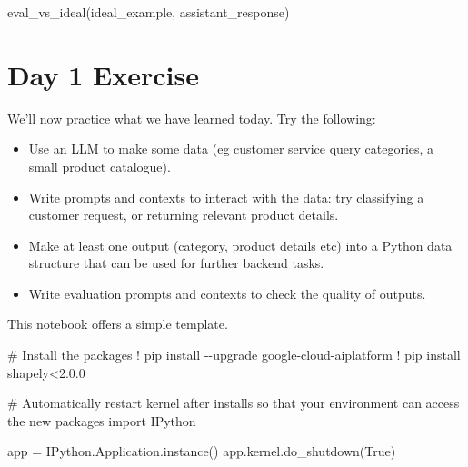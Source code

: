 \documentclass[
  letterpaper,
  DIV=11,
  numbers=noendperiod]{scrreprt}
\newenvironment{Shaded}{\begin{snugshade}}{\end{snugshade}}
\newcommand{\CommentTok}[1]{\textcolor[rgb]{0.37,0.37,0.37}{#1}}
\newcommand{\FloatTok}[1]{\textcolor[rgb]{0.68,0.00,0.00}{#1}}
\newcommand{\ImportTok}[1]{\textcolor[rgb]{0.00,0.46,0.62}{#1}}
\newcommand{\NormalTok}[1]{\textcolor[rgb]{0.00,0.23,0.31}{#1}}
\newcommand{\OperatorTok}[1]{\textcolor[rgb]{0.37,0.37,0.37}{#1}}
\newcommand{\VariableTok}[1]{\textcolor[rgb]{0.07,0.07,0.07}{#1}}
\begin{document}
\begin{Shaded}
\begin{Highlighting}[]
\NormalTok{eval\_vs\_ideal(ideal\_example, assistant\_response)}
\end{Highlighting}
\end{Shaded}

\hypertarget{day-1-exercise}{%
\chapter{Day 1 Exercise}\label{day-1-exercise}}

We'll now practice what we have learned today. Try the following:

\begin{itemize}
\item
  Use an LLM to make some data (eg customer service query categories, a
  small product catalogue).
\item
  Write prompts and contexts to interact with the data: try classifying
  a customer request, or returning relevant product details.
\item
  Make at least one output (category, product details etc) into a Python
  data structure that can be used for further backend tasks.
\item
  Write evaluation prompts and contexts to check the quality of outputs.
\end{itemize}

This notebook offers a simple template.

\begin{Shaded}
\begin{Highlighting}[]
\CommentTok{\# Install the packages}
\OperatorTok{!}\NormalTok{ pip install }\OperatorTok{{-}{-}}\NormalTok{upgrade google}\OperatorTok{{-}}\NormalTok{cloud}\OperatorTok{{-}}\NormalTok{aiplatform}
\OperatorTok{!}\NormalTok{ pip install shapely}\OperatorTok{\textless{}}\FloatTok{2.0.0}
\end{Highlighting}
\end{Shaded}

\begin{Shaded}
\begin{Highlighting}[]
\CommentTok{\# Automatically restart kernel after installs so that your environment can access the new packages}
\ImportTok{import}\NormalTok{ IPython}

\NormalTok{app }\OperatorTok{=}\NormalTok{ IPython.Application.instance()}
\NormalTok{app.kernel.do\_shutdown(}\VariableTok{True}\NormalTok{)}
\end{Highlighting}
\end{Shaded}
\end{document}
